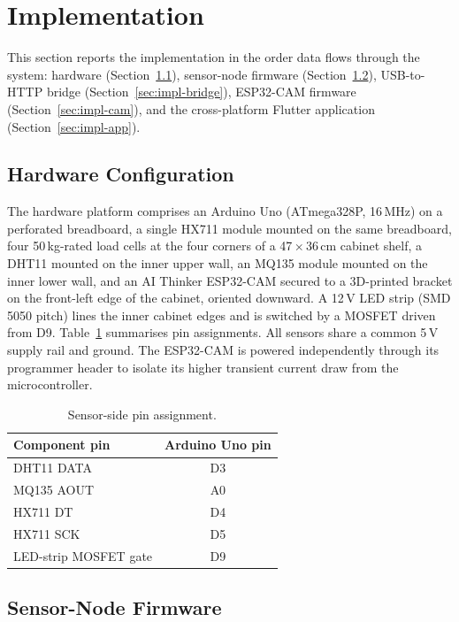 \section{Implementation}
\label{sec:implementation}

This section reports the implementation in the order data flows
through the system: hardware (Section~\ref{sec:impl-hw}), sensor-node
firmware (Section~\ref{sec:impl-fw}), USB-to-HTTP bridge
(Section~\ref{sec:impl-bridge}), ESP32-CAM firmware
(Section~\ref{sec:impl-cam}), and the cross-platform Flutter
application (Section~\ref{sec:impl-app}).

\subsection{Hardware Configuration}
\label{sec:impl-hw}

The hardware platform comprises an Arduino Uno (ATmega328P, 16\,MHz)
on a perforated breadboard, a single HX711 module mounted on the same
breadboard, four 50\,kg-rated load cells at the four corners of a
47\,$\times$\,36\,cm cabinet shelf, a DHT11 mounted on the inner
upper wall, an MQ135 module mounted on the inner lower wall, and an
AI Thinker ESP32-CAM secured to a 3D-printed bracket on the
front-left edge of the cabinet, oriented downward. A 12\,V LED strip
(SMD 5050 pitch) lines the inner cabinet edges and is switched by a
MOSFET driven from D9. Table~\ref{tab:wiring} summarises pin
assignments. All sensors share a common 5\,V supply rail and ground.
The ESP32-CAM is powered independently through its programmer header
to isolate its higher transient current draw from the
microcontroller.

\begin{table}[t]
\caption{Sensor-side pin assignment.}
\label{tab:wiring}
\centering
\renewcommand{\arraystretch}{1.2}
\begin{tabular}{@{}lc@{}}
\toprule
\textbf{Component pin} & \textbf{Arduino Uno pin} \\
\midrule
DHT11 DATA              & D3 \\
MQ135 AOUT              & A0 \\
HX711 DT                & D4 \\
HX711 SCK               & D5 \\
LED-strip MOSFET gate   & D9 \\
\bottomrule
\end{tabular}
\end{table}

\subsection{Sensor-Node Firmware}
\label{sec:impl-fw}

